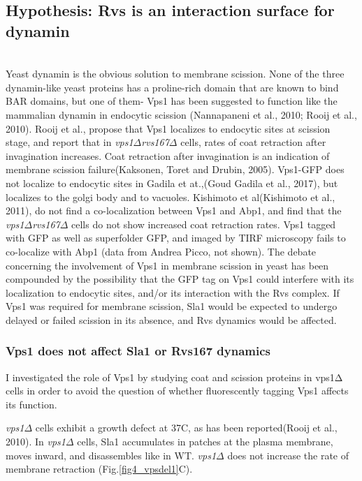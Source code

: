 \subsection{Hypothesis: Rvs is an  interaction surface for dynamin }
	\mbox{}\\
Yeast dynamin is the obvious solution to membrane scission. None of the three dynamin-like yeast proteins has a proline-rich domain that are known to bind BAR domains, but one of them- Vps1 has been suggested to function like the mammalian dynamin in endocytic scission (Nannapaneni et al., 2010; Rooij et al., 2010). Rooij et al., propose that Vps1 localizes to endocytic sites at scission stage, and report that in \textit{vps1$\Delta$}\textit{rvs167$\Delta$} cells, rates of coat retraction after invagination increases. Coat retraction after invagination is an indication of membrane scission failure(Kaksonen, Toret and Drubin, 2005). Vps1-GFP does not localize to endocytic sites in Gadila et at.,(Goud Gadila et al., 2017), but localizes to the golgi body and to vacuoles. Kishimoto et al(Kishimoto et al., 2011), do not find a co-localization between Vps1 and Abp1, and find that the \textit{vps1$\Delta$}\textit{rvs167$\Delta$} cells do not show increased coat retraction rates. Vps1 tagged with GFP as well as superfolder GFP, and imaged by TIRF microscopy fails to co-localize with Abp1 (data from Andrea Picco, not shown). The debate concerning the involvement of Vps1 in membrane scission in yeast has been compounded by the possibility that the GFP tag on Vps1 could interfere with its localization to endocytic sites, and/or its interaction with the Rvs complex. If Vps1 was required for membrane scission, Sla1 would be expected to undergo delayed or failed scission in its absence, and Rvs dynamics would be affected. 





	
			\subsubsection{Vps1 does not affect Sla1 or Rvs167 dynamics }
I investigated the role of Vps1 by studying coat and scission proteins in vps1Δ cells in order to avoid the question of whether fluorescently tagging Vps1 affects its function. 
\vspace{5mm}

\textit{vps1$\Delta$}   cells exhibit a growth defect at 37C, as has been reported(Rooij et al., 2010). In \textit{vps1$\Delta$}   cells, Sla1 accumulates in patches at the plasma membrane, moves inward, and disassembles like in WT. \textit{vps1$\Delta$}   does not increase the rate of membrane retraction  (Fig.\ref{fig4_vpsdel1}C). 

